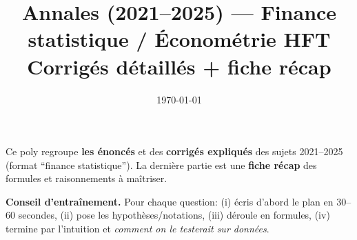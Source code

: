 \documentclass[11pt,a4paper]{article}
\title{Annales (2021--2025) --- Finance statistique / Économétrie HFT\\
\large Corrigés détaillés + fiche récap}
\author{}
\date{\today}
\newcommand{\1}{\mathbf{1}}
\begin{document}
\maketitle
\tableofcontents
\bigskip

\begin{tcolorbox}[title={Comment utiliser ce document (2 minutes)}]
Ce poly regroupe \textbf{les énoncés} et des \textbf{corrigés expliqués} des sujets 2021--2025 (format ``finance statistique''). La dernière partie est une \textbf{fiche récap} des formules et raisonnements à maîtriser.

\medskip
\textbf{Conseil d'entraînement.} Pour chaque question: (i) écris d'abord le plan en 30--60 secondes, (ii) pose les hypothèses/notations, (iii) déroule en formules, (iv) termine par l'intuition et \emph{comment on le testerait sur données}.
\end{tcolorbox}

\clearpage

\clearpage

\clearpage

\clearpage

\clearpage

\clearpage

\end{document}
